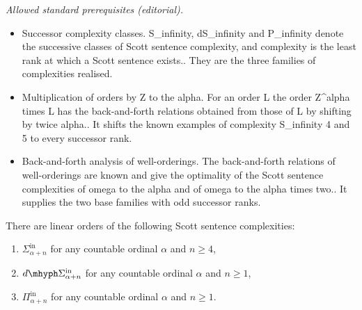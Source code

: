 \documentclass[10pt,a4paper]{amsart}
\providecommand{\Pinf}[1]{\Pi^{\mathrm{in}}_{#1}}
\providecommand{\Sinf}[1]{\Sigma^{\mathrm{in}}_{#1}}
\providecommand{\dSinf}[1]{d\mhyph\Sigma^{\mathrm{in}}_{#1}}
\begin{document}
\noindent\textit{Allowed standard prerequisites (editorial).}\begin{itemize}
\item Successor complexity classes. S\_infinity, dS\_infinity and P\_infinity denote the successive classes of Scott sentence complexity, and complexity is the least rank at which a Scott sentence exists.. They are the three families of complexities realised.
\item Multiplication of orders by Z to the alpha. For an order L the order Z\textasciicircum{}alpha times L has the back-and-forth relations obtained from those of L by shifting by twice alpha.. It shifts the known examples of complexity S\_infinity 4 and 5 to every successor rank.
\item Back-and-forth analysis of well-orderings. The back-and-forth relations of well-orderings are known and give the optimality of the Scott sentence complexities of omega to the alpha and of omega to the alpha times two.. It supplies the two base families with odd successor ranks.
\end{itemize}\medskip
\begin{corollary}\label{cor:SSCsuccessors}
There are linear orders of the following Scott sentence complexities:
\begin{enumerate}
\item $\Sinf{\alpha+n}$ for any countable ordinal $\alpha$ and $n\geq 4$,
\item $\dSinf{\alpha+n}$ for any countable ordinal $\alpha $ and $n\geq 1$,
\item $\Pinf{\alpha+n}$ for any countable ordinal $\alpha$ and $n\geq 1$.
\end{enumerate}
\end{corollary}
\end{document}
